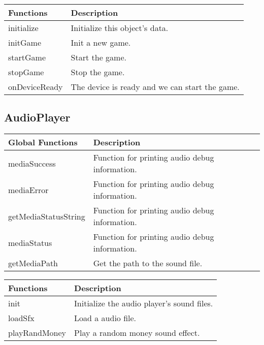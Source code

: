 	\begin{table}[H]
	\begin{tabular}{p{4cm} | p{8cm} }
	\hline
	\rowcolor{gray}
	Functions & Description \\ \hline
	initialize & Initialize this object's data. \\ \hline
  	initGame & Init a new game. \\ \hline
  	startGame & Start the game. \\ \hline
  	stopGame & Stop the game. \\ \hline
  	onDeviceReady & The device is ready and we can start the game. \\ \hline

	\end{tabular}
	\end{table}

	



\subsection*{AudioPlayer}

	\begin{table}[H]
	\begin{tabular}{p{4cm} | p{8cm} }
	\hline
	\rowcolor{gray}
	Global Functions & Description \\ \hline
	mediaSuccess & Function for printing audio debug information. \\ \hline
	mediaError & Function for printing audio debug information. \\ \hline
	getMediaStatusString & Function for printing audio debug information. \\ \hline
	mediaStatus & Function for printing audio debug information. \\ \hline
	getMediaPath & Get the path to the sound file.  \\ \hline
	\end{tabular}
	\end{table}

	\begin{table}[H]
	\begin{tabular}{p{4cm} | p{8cm} }
	\hline
	\rowcolor{gray}
	Functions & Description \\ \hline
	init & Initialize the audio player's sound files. \\ \hline
	loadSfx & Load a audio file. \\ \hline
	playRandMoney & Play a random money sound effect. \\ \hline
	\end{tabular}
	\end{table}

